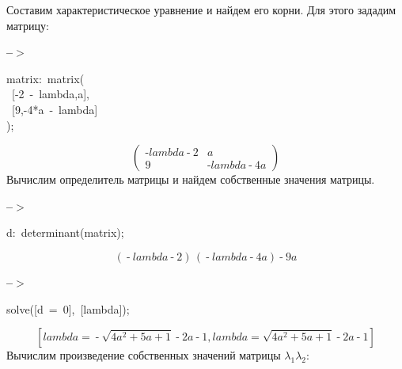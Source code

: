 \documentclass[fleqn, 14pt]{article}
\begin{document}
Составим характеристическое уравнение и найдем его корни. Для этого зададим матрицу:

\begin{minipage}[t]{4.000000em}\color{red}\bfseries
 --\ensuremath{\ensuremath{>}}	
\end{minipage}
\begin{minipage}[t]{\textwidth}\color{blue}
matrix:\ matrix(\\
\ [-2\ -\ lambda,a],\ \\
\ [9,-4*a\ -\ lambda]\\
);\\

\end{minipage}
\[\displaystyle \tag{matrix} 
\begin{pmatrix}\operatorname{-}lambda\operatorname{-}2 & a\\
9 & \operatorname{-}lambda\operatorname{-}4 a\end{pmatrix}\mbox{}
\]
Вычислим определитель матрицы и найдем
собственные значения матрицы.


\noindent
\begin{minipage}[t]{4.000000em}\color{red}\bfseries
 --\ensuremath{\ensuremath{>}}	
\end{minipage}
\begin{minipage}[t]{\textwidth}\color{blue}
d:\ determinant(matrix);
\end{minipage}
\[\displaystyle \tag{d} 
\left( \operatorname{-}lambda\operatorname{-}2\right) \, \left( \operatorname{-}lambda\operatorname{-}4 a\right) \operatorname{-}9 a\mbox{}
\]




\noindent
\begin{minipage}[t]{4.000000em}\color{red}\bfseries
 --\ensuremath{\ensuremath{>}}	
\end{minipage}
\begin{minipage}[t]{\textwidth}\color{blue}
solve([d\ =\ 0],\ [lambda]);
\end{minipage}
\[\displaystyle \tag{\% o39} 
\operatorname{[}lambda\operatorname{=}\operatorname{-}\sqrt{4 {{a}^{2}}\operatorname{+}5 a\operatorname{+}1}\operatorname{-}2 a\operatorname{-}1\operatorname{,}lambda\operatorname{=}\sqrt{4 {{a}^{2}}\operatorname{+}5 a\operatorname{+}1}\operatorname{-}2 a\operatorname{-}1\operatorname{]}\mbox{}
\]
Вычислим произведение собственных значений матрицы $\lambda_1 \lambda_2$:
\end{document}
